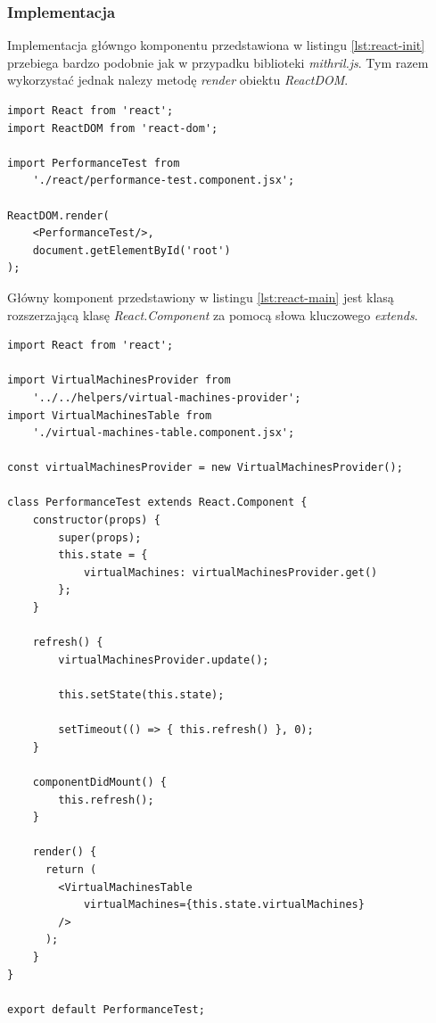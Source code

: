 \documentclass[polish, twoside, 12pt]{mwart}
\begin{document}
\subsubsection{Implementacja}

Implementacja główngo komponentu przedstawiona w listingu \ref{lst:react-init} przebiega bardzo podobnie jak w przypadku biblioteki \emph{mithril.js}. Tym razem wykorzystać jednak nalezy metodę \emph{render} obiektu \emph{ReactDOM}.

\begin{lstlisting}[caption=Inicjalizacja głównego komponentu, label={lst:react-init}]
import React from 'react';
import ReactDOM from 'react-dom';

import PerformanceTest from
    './react/performance-test.component.jsx';

ReactDOM.render(
    <PerformanceTest/>,
    document.getElementById('root')
);
\end{lstlisting}

Główny komponent przedstawiony w listingu \ref{lst:react-main} jest klasą rozszerzającą klasę \emph{React.Component} za pomocą słowa kluczowego \emph{extends}.

\begin{lstlisting}[caption=Główny komponent, label={lst:react-main}]
import React from 'react';

import VirtualMachinesProvider from
    '../../helpers/virtual-machines-provider';
import VirtualMachinesTable from
    './virtual-machines-table.component.jsx';

const virtualMachinesProvider = new VirtualMachinesProvider();

class PerformanceTest extends React.Component {
    constructor(props) {
        super(props);
        this.state = {
            virtualMachines: virtualMachinesProvider.get()
        };
    }

    refresh() {
        virtualMachinesProvider.update();

        this.setState(this.state);

        setTimeout(() => { this.refresh() }, 0);
    }

    componentDidMount() {
        this.refresh();
    }

    render() {
      return (
        <VirtualMachinesTable
            virtualMachines={this.state.virtualMachines}
        />
      );
    }
}

export default PerformanceTest;
\end{lstlisting}
\end{document}
